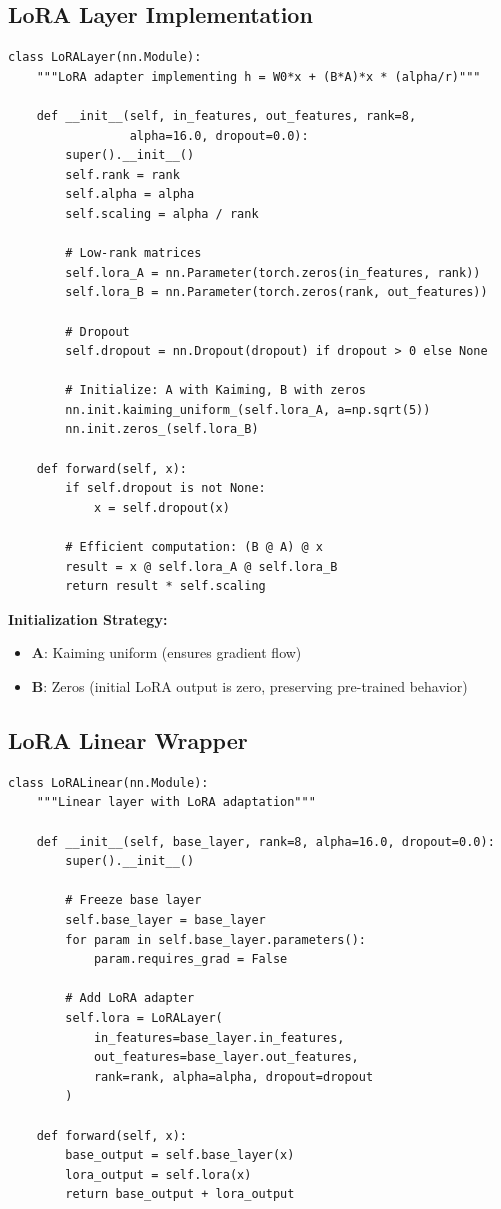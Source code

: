 \documentclass[11pt,a4paper]{article}
\begin{document}
\subsection{LoRA Layer Implementation}

\begin{lstlisting}[caption={LoRA Layer Class (lines 82-121)}]
class LoRALayer(nn.Module):
    """LoRA adapter implementing h = W0*x + (B*A)*x * (alpha/r)"""

    def __init__(self, in_features, out_features, rank=8,
                 alpha=16.0, dropout=0.0):
        super().__init__()
        self.rank = rank
        self.alpha = alpha
        self.scaling = alpha / rank

        # Low-rank matrices
        self.lora_A = nn.Parameter(torch.zeros(in_features, rank))
        self.lora_B = nn.Parameter(torch.zeros(rank, out_features))

        # Dropout
        self.dropout = nn.Dropout(dropout) if dropout > 0 else None

        # Initialize: A with Kaiming, B with zeros
        nn.init.kaiming_uniform_(self.lora_A, a=np.sqrt(5))
        nn.init.zeros_(self.lora_B)

    def forward(self, x):
        if self.dropout is not None:
            x = self.dropout(x)

        # Efficient computation: (B @ A) @ x
        result = x @ self.lora_A @ self.lora_B
        return result * self.scaling
\end{lstlisting}

\textbf{Initialization Strategy:}
\begin{itemize}
    \item $\mathbf{A}$: Kaiming uniform (ensures gradient flow)
    \item $\mathbf{B}$: Zeros (initial LoRA output is zero, preserving pre-trained behavior)
\end{itemize}

\subsection{LoRA Linear Wrapper}

\begin{lstlisting}[caption={LoRA Linear Layer (lines 123-161)}]
class LoRALinear(nn.Module):
    """Linear layer with LoRA adaptation"""

    def __init__(self, base_layer, rank=8, alpha=16.0, dropout=0.0):
        super().__init__()

        # Freeze base layer
        self.base_layer = base_layer
        for param in self.base_layer.parameters():
            param.requires_grad = False

        # Add LoRA adapter
        self.lora = LoRALayer(
            in_features=base_layer.in_features,
            out_features=base_layer.out_features,
            rank=rank, alpha=alpha, dropout=dropout
        )

    def forward(self, x):
        base_output = self.base_layer(x)
        lora_output = self.lora(x)
        return base_output + lora_output
\end{lstlisting}
\end{document}
